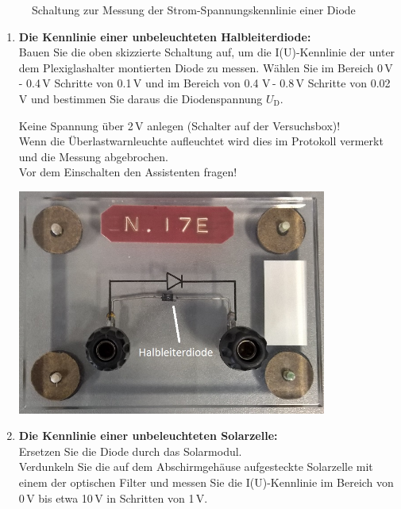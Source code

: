 \begin{figure}[h]
	\centering
	
	\caption{Schaltung zur Messung der Strom-Spannungskennlinie einer Diode}
\end{figure}

\begin{enumerate}
	\item \textbf{Die Kennlinie einer unbeleuchteten Halbleiterdiode:}\\
		Bauen Sie die oben skizzierte Schaltung auf, um die I(U)-Kennlinie der unter dem Plexiglashalter montierten Diode zu messen. Wählen Sie im Bereich 0\,V - 0.4\,V Schritte von 0.1\,V und im Bereich von 0.4 V\,- 0.8\,V Schritte von 0.02\,V und bestimmen Sie daraus die Diodenspannung $U_{\mathrm{D}}$.\\
		\begin{minipage}{0.6\textwidth}
		\begin{jason}
		Keine Spannung über 2\,V anlegen (Schalter auf der Versuchsbox)!\\
		Wenn die Überlastwarnleuchte aufleuchtet wird dies im Protokoll vermerkt und die Messung abgebrochen.\\
		Vor dem Einschalten den Assistenten fragen!
		\end{jason}
		\end{minipage}
		\begin{minipage}{0.4\textwidth}
			\includegraphics[width=0.8\textwidth]{Abbildungen/Diode.jpg}
			\label{fig:Bild15}
		\end{minipage}
	\item \textbf{Die Kennlinie einer unbeleuchteten Solarzelle:}\\
		Ersetzen Sie die Diode durch das Solarmodul.\\
		Verdunkeln Sie die auf dem Abschirmgehäuse aufgesteckte Solarzelle mit einem der optischen Filter und messen Sie die I(U)-Kennlinie im Bereich von 0\,V bis etwa 10\,V in Schritten von 1\,V.
 

\end{enumerate}
